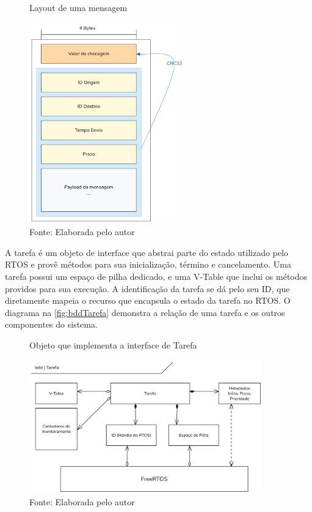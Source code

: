 \begin{figure}[H]
    \centering
    \captionsetup{justification=centering}
    \caption{Layout de uma mensagem}
    \includegraphics[width=0.60\textwidth]{assets/payload_layout.png}
    \captionsetup{justification=raggedright}
    \caption*{Fonte: Elaborada pelo autor}
    \label{fig:messageStruct}
\end{figure}

A tarefa é um objeto de interface que abstrai parte do estado utilizado pelo RTOS e provê métodos para sua inicialização, término e cancelamento. Uma tarefa possui um espaço de pilha dedicado, e uma V-Table que inclui os métodos providos para sua execução. A identificação da tarefa se dá pelo seu ID, que diretamente mapeia o recurso que encapsula o estado da tarefa no RTOS. O diagrama na \autoref{fig:bddTarefa} demonstra a relação de uma tarefa e os outros componentes do sistema.

\begin{figure}[H]
    \centering
    \captionsetup{justification=centering}
    \caption{Objeto que implementa a interface de Tarefa}
    \includegraphics[width=0.90\textwidth]{assets/task_bdd.png}
    \captionsetup{justification=raggedright}
    \caption*{Fonte: Elaborada pelo autor}
    \label{fig:bddTarefa}
\end{figure}


